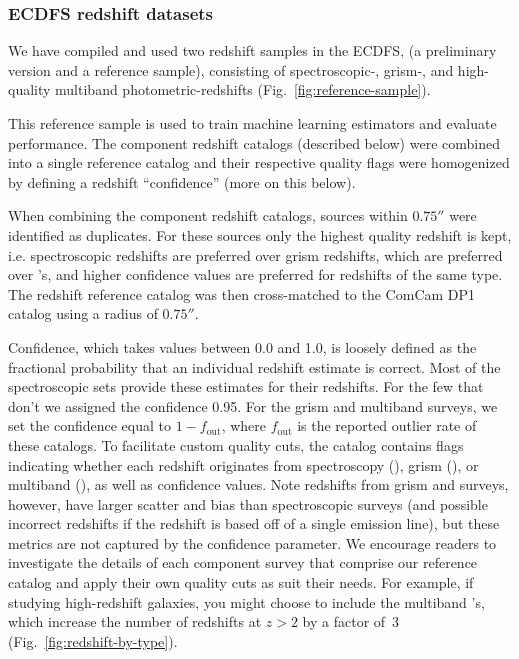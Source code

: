 \subsubsection{ECDFS redshift datasets}
\label{sec:data:prelim}

We have compiled and used two redshift samples in the ECDFS, (a preliminary version and a reference sample), consisting of spectroscopic-, grism-, and high-quality multiband photometric-redshifts (Fig.~\ref{fig:reference-sample}).   

This reference sample is used to train machine learning \photoz estimators and evaluate \photoz performance.
The component redshift catalogs (described below) were combined into a single reference catalog and their respective quality flags were homogenized by defining a redshift ``confidence'' (more on this below).

When combining the component redshift catalogs, sources within $0.75''$ were identified as duplicates.
For these sources only the highest quality redshift is kept, i.e. spectroscopic redshifts are preferred over grism redshifts, which are preferred over \photoz's, and higher confidence values are preferred for redshifts of the same type.
The redshift reference catalog was then cross-matched to the ComCam DP1 catalog using a radius of $0.75''$.

Confidence, which takes values between 0.0 and 1.0, is loosely defined as the fractional probability that an individual redshift estimate is correct.
Most of the spectroscopic sets provide these estimates for their redshifts.
For the few that don't we assigned the confidence 0.95.
For the grism and multiband \photoz surveys, we set the confidence equal to $1 - f_\text{out}$, where $f_\text{out}$ is the reported outlier rate of these catalogs.
To facilitate custom quality cuts, the catalog contains flags indicating whether each redshift originates from spectroscopy (), grism (), or multiband \photoz (), as well as confidence values.
Note redshifts from grism and \photoz surveys, however, have larger scatter and bias than spectroscopic surveys (and possible incorrect redshifts if the redshift is based off of a single emission line), but these metrics are not captured by the confidence parameter.
We encourage readers to investigate the details of each component survey that comprise our reference catalog and apply their own quality cuts as suit their needs.
For example, if studying high-redshift galaxies, you might choose to include the multiband \photoz's, which increase the number of redshifts at $z > 2$ by a factor of~3 (Fig.~\ref{fig:redshift-by-type}).

